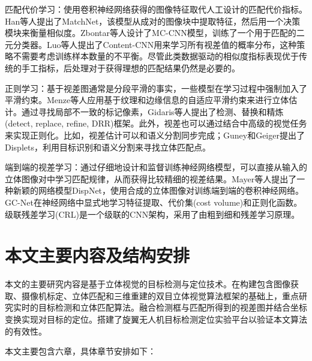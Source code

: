 匹配代价学习：使用卷积神经网络获得的图像特征取代人工设计的匹配代价指标。Han等人\cite{Han_2015_CVPR}提出了MatchNet，该模型从成对的图像块中提取特征，然后用一个决策模块来衡量相似度。Zbontar等人\cite{zbontar2016stereo}设计了MC-CNN模型，训练了一个用于匹配的二元分类器。Luo等人\cite{luo2016efficient}提出了Content-CNN用来学习所有视差值的概率分布，这种策略不需要考虑训练样本数量的不平衡。尽管此类数据驱动的相似度指标表现优于传统的手工指标，后处理对于获得理想的匹配结果仍然是必要的。

正则学习：基于视差图通常是分段平滑的事实，一些模型在学习过程中强制加入了平滑约束。Menze等人\cite{Menze_2015_CVPR}应用基于纹理和边缘信息的自适应平滑约束来进行立体估计。通过寻找局部不一致的标记像素，Gidaris等人\cite{gidaris2016detect}提出了检测、替换和精炼(detect, replace, refine, DRR)框架。此外，视差也可以通过结合中高级的视觉任务来实现正则化。比如，视差估计可以和语义分割同步完成\cite{yamaguchi2014}；Guney和Geiger提出了Displets\cite{guney2015displets}，利用目标识别和语义分割来寻找立体匹配点。

端到端的视差学习：通过仔细地设计和监督训练神经网络模型，可以直接从输入的立体图像对中学习匹配规律，从而获得比较精细的视差结果。Mayer\cite{mayer2016large}等人提出了一种新颖的网络模型DispNet，使用合成的立体图像对训练端到端的卷积神经网络。GC-Net\cite{kendall2017end}在神经网络中显式地学习特征提取、代价集(cost volume)和正则化函数。级联残差学习(CRL)\cite{pang2017cascade}是一个级联的CNN架构，采用了由粗到细和残差学习原理。



\section{本文主要内容及结构安排}

本文的主要研究内容是基于立体视觉的目标检测与定位技术。在构建包含图像获取、摄像机标定、立体匹配和三维重建的双目立体视觉算法框架的基础上，重点研究实时的目标检测和立体匹配算法。融合检测框与匹配所得到的视差图并结合坐标变换实现对目标的定位。搭建了旋翼无人机目标检测定位实验平台以验证本文算法的有效性。

本文主要包含六章，具体章节安排如下：

